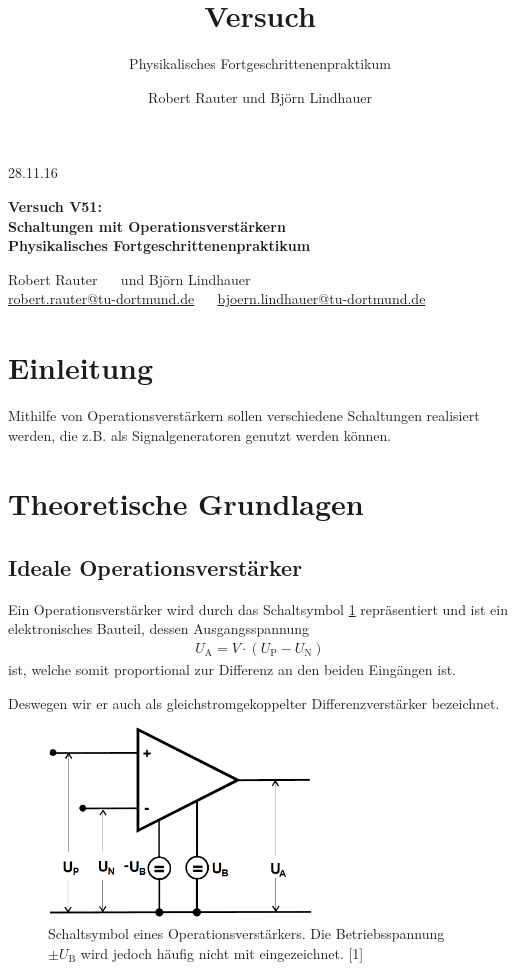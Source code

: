 \documentclass[]{scrartcl}
\title{Versuch \versuchnummer\\ \versuchname}
\subtitle{Physikalisches Fortgeschrittenenpraktikum}
\author{Robert Rauter und Björn Lindhauer}
\date{\versuchdatum}
\newcommand{\versuchnummer}{V51}
\newcommand{\versuchname}{Schaltungen mit Operationsverstärkern}
\newcommand{\versuchdatum}{28.11.16}
\let\oldsection\section
\renewcommand\section{\clearpage\oldsection}
\begin{document}
\begin{titlepage}
{\large \versuchdatum}
\vspace{7cm}
\begin{center}
\textbf{\huge Versuch \versuchnummer:}\\
\vspace{0.5cm}
\textbf{\huge \versuchname}\\
\vspace{0.2cm}
\textbf{ Physikalisches Fortgeschrittenenpraktikum}\\
\vspace{9cm}

{\Large Robert Rauter \ \ \hspace{1.5cm} und \hspace{1.5cm} Björn Lindhauer}\\
{ \url{robert.rauter@tu-dortmund.de} \ \ \hspace{2cm} \url{bjoern.lindhauer@tu-dortmund.de}}
\end{center}
\end{titlepage}
\section{Einleitung}
Mithilfe von Operationsverstärkern sollen verschiedene Schaltungen realisiert werden, die z.B. als Signalgeneratoren genutzt werden können.

\section{Theoretische Grundlagen}
\subsection{Ideale Operationsverstärker}
Ein Operationsverstärker wird durch das Schaltsymbol \ref{fig:schaltsymbol_operationsverstaerker} repräsentiert und ist ein elektronisches Bauteil, dessen Ausgangsspannung
\begin{align}
 U_{\text{A}}=V\cdot \left( U_{\text{P}}-U_{\text{N}} \right)
\end{align}
ist, welche somit proportional zur Differenz an den beiden Eingängen ist.

Deswegen wir er auch als gleichstromgekoppelter Differenzverstärker bezeichnet.

\begin{figure}[H]
\centering
\includegraphics[width=7cm]{images/schaltsymbol_operationsverstaerker.png}
\caption{Schaltsymbol eines Operationsverstärkers. Die Betriebsspannung $\pm U_{\text{B}}$ wird jedoch häufig nicht mit eingezeichnet. [1]}
\label{fig:schaltsymbol_operationsverstaerker}
\end{figure}
\end{document}
